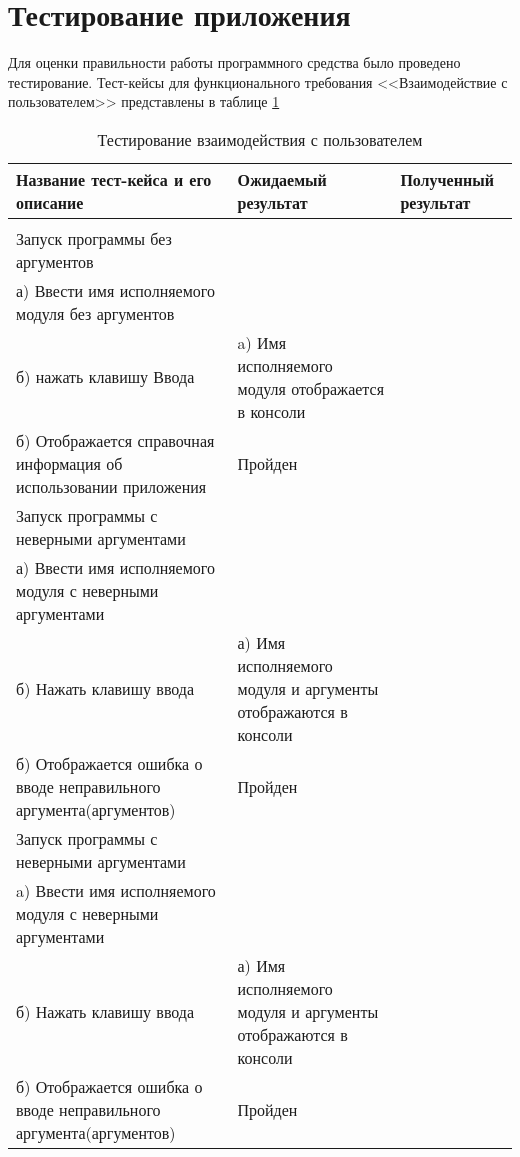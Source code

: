 \section{Тестирование приложения}
\label{sec:testing}

Для оценки правильности работы программного средства было проведено тестирование. Тест-кейсы для функционального требования <<Взаимодействие с пользователем>> представлены в таблице \ref{sec:testing:interaction_cases}



\begin{longtable}[l]{| >{\raggedright}m{}
                  | >{\raggedright}m{}
                  | >{\raggedright\arraybackslash}m{}|}
  \caption{Тестирование взаимодействия с пользователем}
  \label{sec:testing:interaction_cases} \tabularnewline

  \hline
       Название тест-кейса и его описание & Ожидаемый результат  & Полученный результат \\
   \hline
   \centering{1} & \centering{2} & \centering{3} \tabularnewline
   \hline
   Запуск программы без аргументов \\ а) Ввести имя исполняемого модуля без аргументов \\ б) нажать клавишу Ввода  &
   a) Имя исполняемого модуля отображается в консоли \\ б) Отображается справочная информация об использовании приложения &
   Пройден \\
   \hline


  Запуск программы с неверными аргументами \\
   а) Ввести имя исполняемого модуля с неверными аргументами \\
   б) Нажать клавишу ввода
   &
   а) Имя исполняемого модуля и аргументы отображаются в консоли \\
   б) Отображается ошибка о вводе неправильного аргумента(аргументов)
   &
   Пройден \\
   \hline

   Запуск программы с неверными аргументами \\
   a) Ввести имя исполняемого модуля с неверными аргументами \\
   б) Нажать клавишу ввода
   &
   а) Имя исполняемого модуля и аргументы отображаются в консоли \\
   б) Отображается ошибка о вводе неправильного аргумента(аргументов)
   &
   Пройден \\


\end{longtable}
